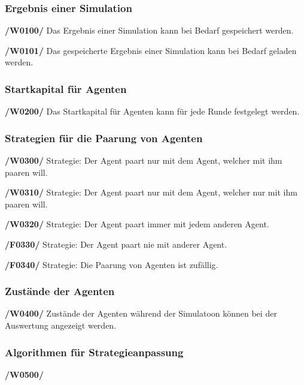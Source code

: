 \subsubsection{Ergebnis einer Simulation}

\textbf{/W0100/}
Das Ergebnis einer Simulation kann bei Bedarf gespeichert werden.

\textbf{/W0101/}
Das gespeicherte Ergebnis einer Simulation kann bei Bedarf geladen werden.

\subsubsection{Startkapital für Agenten}

\textbf{/W0200/}
Das Startkapital für Agenten kann für jede Runde festgelegt werden.

\subsubsection{Strategien für die Paarung von Agenten}

\textbf{/W0300/}
Strategie: Der Agent paart nur mit dem Agent, welcher mit ihm paaren will.

\textbf{/W0310/}
Strategie: Der Agent paart nur mit dem Agent, welcher nur mit ihm paaren will.

\textbf{/W0320/} 
Strategie: Der Agent paart immer mit jedem anderen Agent.

\textbf{/F0330/}
Strategie: Der Agent paart nie mit anderer Agent.

\textbf{/F0340/}
Strategie: Die Paarung von Agenten ist zufällig.

\subsubsection{Zustände der Agenten}

\textbf{/W0400/}
Zustände der Agenten während der Simulatoon können bei der Auswertung angezeigt werden.

\subsubsection{Algorithmen für Strategieanpassung}

\textbf{/W0500/}